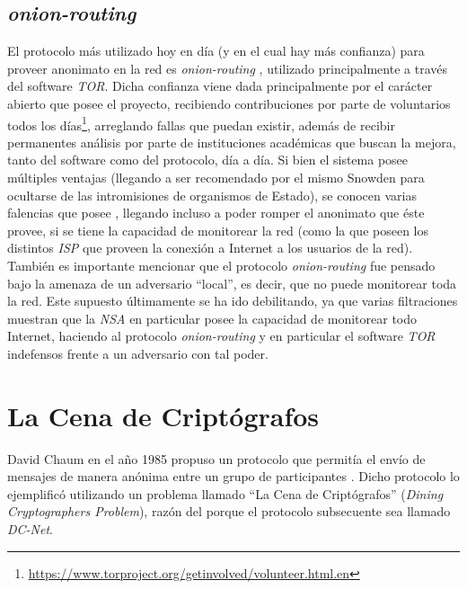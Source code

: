 \subsection{\emph{onion-routing}}

El protocolo más utilizado hoy en día (y en el cual hay más confianza) para proveer anonimato en la red es \emph{onion-routing} 
\cite{reed1998anonymous}, utilizado principalmente a través del software \emph{TOR}. Dicha confianza viene dada principalmente por 
el carácter abierto que posee el proyecto, recibiendo contribuciones por parte de voluntarios todos los 
días\footnote{\url{https://www.torproject.org/getinvolved/volunteer.html.en}}, arreglando fallas que puedan existir, además de recibir 
permanentes análisis por parte de instituciones académicas que buscan la mejora, tanto del software como del protocolo, día a día. 
Si bien el sistema posee múltiples ventajas (llegando a ser recomendado por el mismo Snowden para ocultarse de las intromisiones de 
organismos de Estado), se conocen varias falencias que posee \cite{wright2002analysis}, llegando incluso a poder romper el anonimato 
que éste provee, si se tiene la capacidad de monitorear la red (como la que poseen los distintos \emph{ISP} que proveen la conexión a 
Internet a los usuarios de la red). También es importante mencionar que el protocolo \emph{onion-routing} fue pensado bajo la amenaza 
de un adversario ``local'', es decir, que no puede monitorear toda la red. Este supuesto últimamente se ha ido debilitando, ya que 
varias filtraciones muestran que la \emph{NSA} en particular posee la capacidad de monitorear todo Internet, haciendo al protocolo 
\emph{onion-routing} y en particular el software \emph{TOR} indefensos frente a un adversario con tal poder.

\section{La Cena de Criptógrafos}

David Chaum en el año 1985 propuso un protocolo que permitía el envío de mensajes de manera anónima entre un grupo de participantes 
\cite{Chaum:1985:SWI:4372.4373, chaum1988dining}. Dicho protocolo lo ejemplificó utilizando un problema llamado ``La Cena de Criptógrafos'' 
(\emph{Dining Cryptographers Problem}), razón del porque el protocolo subsecuente sea llamado \emph{DC-Net}.

